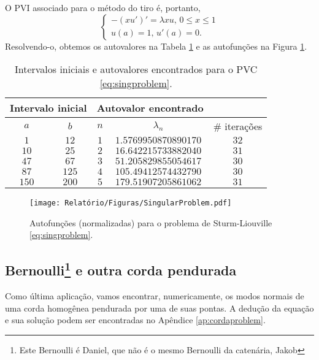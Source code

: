 \documentclass[twocolumn,showpacs,%
  nofootinbib,aps,superscriptaddress,%
  eqsecnum,prd,notitlepage,showkeys,10pt]{revtex4-1}
\renewcommand{\leq}{\leqslant}
\begin{document}
%
O PVI associado para o método do tiro é, portanto,
%
\[
    \left\{
        \begin{array}{l}
            -(xu')' = \lambda xu, \, 0 \leq x\leq 1 \\ 
            u(a) = 1, \, u'(a) = 0.
        \end{array}
    \right.
\]
%
Resolvendo-o, obtemos os autovalores na Tabela \ref{tab:singproblem} e
as autofunções na Figura \ref{fig:singproblem}.
%
\begin{table}[H]
    \centering
    \caption{Intervalos iniciais e autovalores encontrados para o PVC \eqref{eq:singproblem}.}
    \begin{tabular}{cc|cc|c}
        \multicolumn{2}{c}{Intervalo inicial} & \multicolumn{2}{c}{Autovalor encontrado} & \\
        \hline
        $a$ & $b$ & $n$ & $\lambda_n$ & \# iterações \\
        \hline
        $1$ & $12$ & $1$ & $1.5769950870890170$ & $32$ \\
        $10$ & $25$ & $2$ & $16.642215733882040$ & $31$ \\
        $47$ & $67$ & $3$ & $51.205829855054617$ & $30$ \\
        $87$ & $125$ & $4$ & $105.49412574432790$ & $30$ \\
        $150$ & $200$ & $5$ & $179.51907205861062$ & $31$ \\
        \hline
    \end{tabular}
    \label{tab:singproblem}
\end{table}
%
%
\begin{figure}[H]
    \centering
    \texttt{[image: Relatório/Figuras/SingularProblem.pdf]}
    \caption{Autofunções (normalizadas) para o problema de Sturm-Liouville
    \eqref{eq:singproblem}.}
    \label{fig:singproblem}
\end{figure}
%
\subsection{Bernoulli\footnote{Este Bernoulli é Daniel, que não é o mesmo Bernoulli
da catenária, Jakob} e outra corda pendurada}
%
Como última aplicação, vamos encontrar, numericamente, os modos normais
de uma corda homogênea pendurada por uma de suas pontas. A dedução da equação
e sua solução podem ser encontradas no Apêndice \ref{ap:cordaproblem}.
\end{document}
